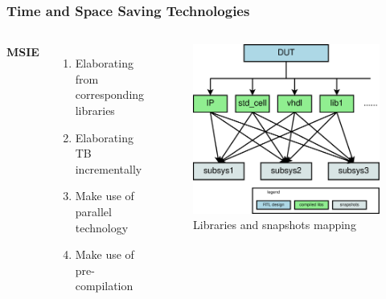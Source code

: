 \documentclass{beamer}
\begin{document}

\begin{frame}
  \frametitle{Time and Space Saving Technologies}
  \begin{columns}[c] %

    \textbf{MSIE}
    \begin{enumerate}
    \item Elaborating from corresponding libraries
    \item Elaborating TB incrementally
    \item Make use of parallel technology
    \item Make use of pre-compilation
    \end{enumerate}

    \begin{figure}
      \centering
      \includegraphics[width=0.9\linewidth]{pm_mapping}
      \caption{Libraries and snapshots mapping}
    \end{figure}

  \end{columns}
\end{frame}

\end{document}
